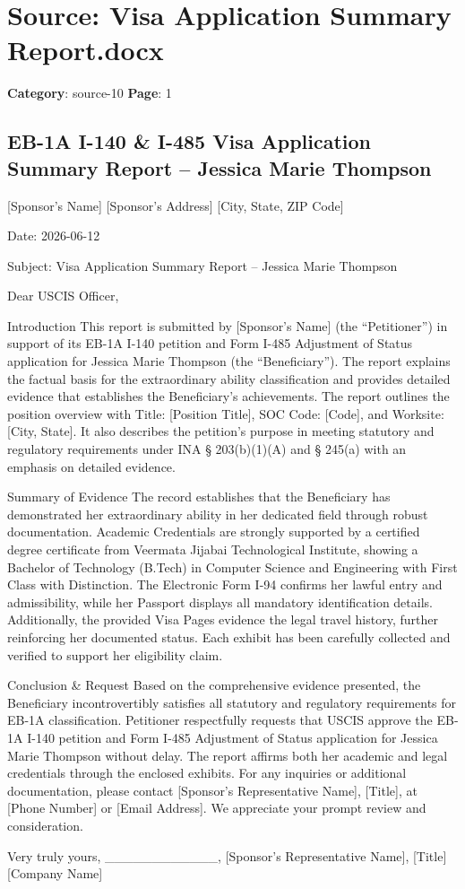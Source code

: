 \section*{Source: Visa Application Summary Report.docx}
\textbf{Category}: source-10
\textbf{Page}: 1

\subsection*{EB-1A I-140 \& I-485 Visa Application Summary Report – Jessica Marie Thompson}

[Sponsor’s Name]
[Sponsor’s Address]
[City, State, ZIP Code]

Date: 2026-06-12

Subject: Visa Application Summary Report – Jessica Marie Thompson

Dear USCIS Officer,

Introduction
This report is submitted by [Sponsor’s Name] (the “Petitioner”) in support of its EB-1A I-140 petition and Form I-485 Adjustment of Status application for Jessica Marie Thompson (the “Beneficiary”). The report explains the factual basis for the extraordinary ability classification and provides detailed evidence that establishes the Beneficiary’s achievements. The report outlines the position overview with Title: [Position Title], SOC Code: [Code], and Worksite: [City, State]. It also describes the petition’s purpose in meeting statutory and regulatory requirements under INA § 203(b)(1)(A) and § 245(a) with an emphasis on detailed evidence.

Summary of Evidence
The record establishes that the Beneficiary has demonstrated her extraordinary ability in her dedicated field through robust documentation. Academic Credentials are strongly supported by a certified degree certificate from Veermata Jijabai Technological Institute, showing a Bachelor of Technology (B.Tech) in Computer Science and Engineering with First Class with Distinction. The Electronic Form I-94 confirms her lawful entry and admissibility, while her Passport displays all mandatory identification details. Additionally, the provided Visa Pages evidence the legal travel history, further reinforcing her documented status. Each exhibit has been carefully collected and verified to support her eligibility claim.

Conclusion \& Request
Based on the comprehensive evidence presented, the Beneficiary incontrovertibly satisfies all statutory and regulatory requirements for EB-1A classification. Petitioner respectfully requests that USCIS approve the EB-1A I-140 petition and Form I-485 Adjustment of Status application for Jessica Marie Thompson without delay. The report affirms both her academic and legal credentials through the enclosed exhibits. For any inquiries or additional documentation, please contact [Sponsor’s Representative Name], [Title], at [Phone Number] or [Email Address]. We appreciate your prompt review and consideration.

Very truly yours,
\_\_\_\_\_\_\_\_\_\_\_\_,
[Sponsor’s Representative Name], [Title]
[Company Name]